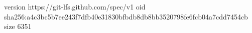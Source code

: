 version https://git-lfs.github.com/spec/v1
oid sha256:a4c3bc5b7ee243f7dfb40e31830bfbdb8db8bb3520798fe6fcb04a7cdd7454cb
size 6351
